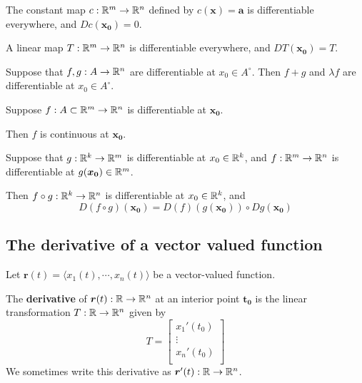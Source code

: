     \begin{example}        
The constant map $c: \mathbb{R}^m \to \mathbb{R}^n$ defined by $c(\bm{x}) = \bm{a}$ is differentiable everywhere, and $Dc(\bm{x_0}) = 0$.
    \end{example}

    \begin{example}
    A linear map $T: \mathbb{R}^m \to \mathbb{R}^n$ is differentiable everywhere, and $DT(\bm{x_0}) = T$.
    \end{example}

    \begin{proposition}
Suppose that $f, g : A \to \mathbb{R}^n$ are differentiable at $x_0  \in A^\circ$. Then $f+g$ and $\lambda f$ are differentiable at $x_0 \in A^\circ$.
\end{proposition}

    \begin{proposition}
    Suppose $f : A \subset \mathbb{R}^m \to \mathbb{R}^n$ is differentiable at $\bm{x_0}$. 
    
    \vspace{1em}
    Then $f$ is continuous at $\bm{x_0}$.
    \end{proposition}

    \begin{theorem}
    Suppose that $g: \mathbb{R}^k \to \mathbb{R}^m$ is differentiable at $x_0 \in \mathbb{R}^k$, and $f : \mathbb{R}^m \to \mathbb{R}^n$ is differentiable at $g(\bm{x_0}) \in \mathbb{R}^m$.  
    
    \vspace{1em}
    
    Then $f \circ g : \mathbb{R}^k \to \mathbb{R}^n$ is differentiable at $x_0 \in \mathbb{R}^k$, and 
    $$D(f \circ g)(\bm{x_0}) = D(f)(g(\bm{x_0})) \circ Dg(\bm{x_0})$$
    
    \end{theorem}


\subsection{The derivative of a vector valued function}

\begin{theorem}
    Let $\bm{r}(t) = \langle x_1(t), \cdots, x_n(t) \rangle$ be a vector-valued function.  
    
    The \textbf{derivative} of $\bm{r}(t) : \mathbb{R} \to \mathbb{R}^n$ at an interior point $\bm{t_0}$ is the linear transformation $T: \mathbb{R} \to \mathbb{R}^n$ given by 
    $$T = 
\begin{bmatrix}
x_1'(t_0) \\
\vdots \\
x_n'(t_0) \\
\end{bmatrix}$$
We sometimes write this derivative as $\bm{r}'(t) : \mathbb{R} \to \mathbb{R}^n$.
\end{theorem}


